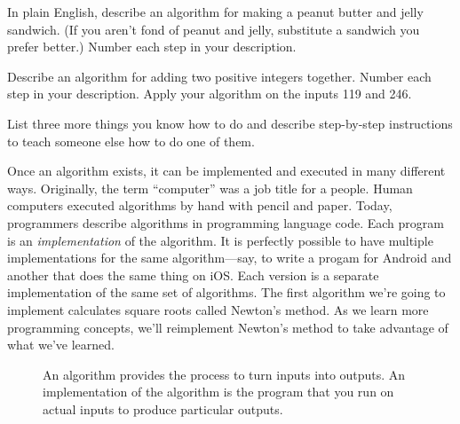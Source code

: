 \begin{question}
In plain English, describe an algorithm for making a peanut butter and jelly
sandwich. (If you aren't fond of peanut and jelly, substitute a sandwich you
prefer better.) Number each step in your description.
\end{question}

\begin{question}
Describe an algorithm for adding two positive integers together. Number each
step in your description. Apply your algorithm on the inputs 119 and 246.
\end{question}

\begin{question}
List three more things you know how to do and describe step-by-step instructions
to teach someone else how to do one of them.
\end{question}

Once an algorithm exists, it can be implemented and executed in many different
ways. Originally, the term ``computer'' was a job title for a people. Human
computers executed algorithms by hand with pencil and paper. Today, programmers
describe algorithms in programming language code. Each program is an
\emph{implementation} of the algorithm. It is perfectly possible to have
multiple implementations for the same algorithm---say, to write a progam for
Android and another that does the same thing on iOS. Each version is a separate
implementation of the same set of algorithms. The first algorithm we're going to
implement calculates square roots called Newton's method. As we learn more
programming concepts, we'll reimplement Newton's method to take advantage of
what we've learned.

\begin{figure}
  
\caption{\label{fig:intro-algorithm-fundemental-diagram} An algorithm provides
the process to turn inputs into outputs. An implementation of the algorithm is
the program that you run on actual inputs to produce particular outputs.}
\end{figure}

